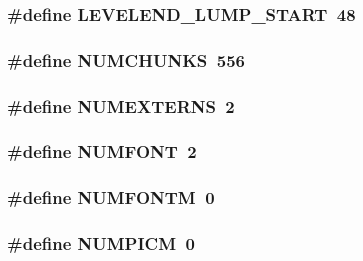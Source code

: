 \label{GFXV__WL1_8H_a01e5f4d5f8e05beb4315b9ad907e06e7}
\hypertarget{GFXV__WL1_8H_a1895eb960cb12bb7b49bf322e79d6c80}{
\subsubsection[{LEVELEND\_\-LUMP\_\-START}]{\setlength{\rightskip}{0pt plus 5cm}\#define LEVELEND\_\-LUMP\_\-START~48}}
\label{GFXV__WL1_8H_a1895eb960cb12bb7b49bf322e79d6c80}
\hypertarget{GFXV__WL1_8H_a06c8b188cc3cdd25a5451beeefddfa66}{
\subsubsection[{NUMCHUNKS}]{\setlength{\rightskip}{0pt plus 5cm}\#define NUMCHUNKS~556}}
\label{GFXV__WL1_8H_a06c8b188cc3cdd25a5451beeefddfa66}
\hypertarget{GFXV__WL1_8H_abb86554baf24d8863e54bf20d68120b5}{
\subsubsection[{NUMEXTERNS}]{\setlength{\rightskip}{0pt plus 5cm}\#define NUMEXTERNS~2}}
\label{GFXV__WL1_8H_abb86554baf24d8863e54bf20d68120b5}
\hypertarget{GFXV__WL1_8H_a7686ac8ed1dbf71ebee2b4711dae0edd}{
\subsubsection[{NUMFONT}]{\setlength{\rightskip}{0pt plus 5cm}\#define NUMFONT~2}}
\label{GFXV__WL1_8H_a7686ac8ed1dbf71ebee2b4711dae0edd}
\hypertarget{GFXV__WL1_8H_afd7a523b060f425fd737a94c044892ac}{
\subsubsection[{NUMFONTM}]{\setlength{\rightskip}{0pt plus 5cm}\#define NUMFONTM~0}}
\label{GFXV__WL1_8H_afd7a523b060f425fd737a94c044892ac}
\hypertarget{GFXV__WL1_8H_a2eb878497ab6b2a4f80015a218f38c8f}{
\subsubsection[{NUMPICM}]{\setlength{\rightskip}{0pt plus 5cm}\#define NUMPICM~0}}
